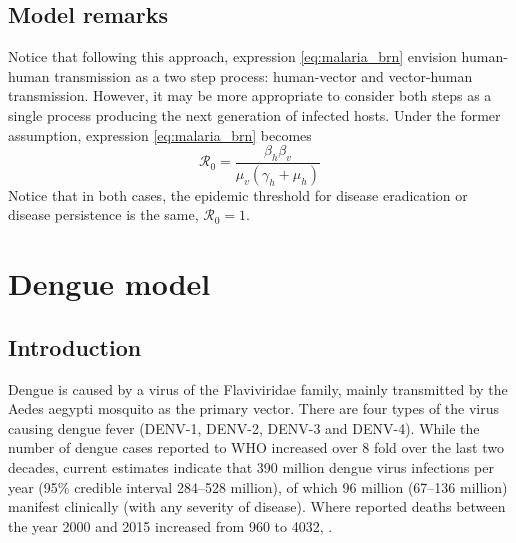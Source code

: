 \documentclass{book}
\begin{document}
\subsection*{Model remarks}
Notice that following this approach, expression \eqref{eq:malaria_brn} envision human-human transmission as a two step process: human-vector and vector-human transmission. However, it may be more appropriate to consider both steps as a single process producing the next generation of infected hosts. Under the former assumption, expression \eqref{eq:malaria_brn} becomes
\begin{equation}
\mathscr{R}_{0}=\frac{\beta_{h} \beta_{v}}{\mu_{v}\left(\gamma_{h}+\mu_{h}\right)}
\end{equation}
%
Notice that in both cases, the epidemic threshold for disease eradication or disease persistence is the same, $\mathcal{R}_0=1$.


\section{Dengue model}

\subsection*{Introduction}
Dengue is caused by a virus of the Flaviviridae family, mainly transmitted by the Aedes aegypti mosquito as the primary vector.
%
There are four types of the virus causing dengue fever (DENV-1, DENV-2, DENV-3 and DENV-4).
%
While the number of dengue cases reported to WHO increased over 8 fold over the last two decades, current estimates indicate that 390 million dengue virus infections per year (95\% credible interval 284–528 million), of which 96 million (67–136 million) manifest clinically (with any severity of disease). Where reported deaths between the year 2000 and 2015 increased from 960 to 4032, \cite{world2014dengue}.
\end{document}
